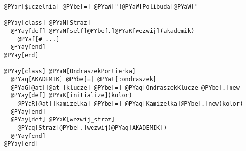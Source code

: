 \begin{Verbatim}[commandchars=@\[\]]
@PYar[$uczelnia] @PYbe[=] @PYaW["]@PYaW[Polibuda]@PYaW["]

@PYay[class] @PYaN[Straz]
  @PYay[def] @PYaN[self]@PYbe[.]@PYaK[wezwij](akademik)
    @PYaf[# ...]
  @PYay[end]
@PYay[end]

@PYay[class] @PYaN[OndraszekPortierka]
  @PYaq[AKADEMIK] @PYbe[=] @PYat[:ondraszek]
  @PYaG[@at[]@at[]klucze] @PYbe[=] @PYaq[OndraszekKlucze]@PYbe[.]new
  @PYay[def] @PYaK[initialize](kolor)
    @PYaR[@at[]kamizelka] @PYbe[=] @PYaq[Kamizelka]@PYbe[.]new(kolor)
  @PYay[end]
  @PYay[def] @PYaK[wezwij_straz]
    @PYaq[Straz]@PYbe[.]wezwij(@PYaq[AKADEMIK])
  @PYay[end]
@PYay[end]
\end{Verbatim}
